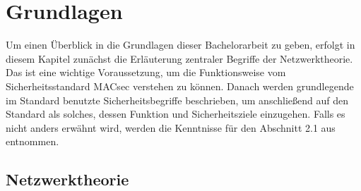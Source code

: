 \chapter{Grundlagen}
\label{sec:state}




Um einen Überblick in die Grundlagen dieser Bachelorarbeit zu geben, erfolgt in diesem Kapitel zunächst die Erläuterung zentraler Begriffe der Netzwerktheorie. Das ist eine wichtige Voraussetzung, um die Funktionsweise vom Sicherheitsstandard \gls{MACsec} verstehen zu können. Danach werden grundlegende im Standard benutzte Sicherheitsbegriffe beschrieben, um anschließend auf den Standard als solches, dessen Funktion und Sicherheitsziele einzugehen. Falls es nicht anders erwähnt wird, werden die Kenntnisse für den Abschnitt 2.1 aus \cite{TN_libero_mab23259530} entnommen.
\section{Netzwerktheorie}


